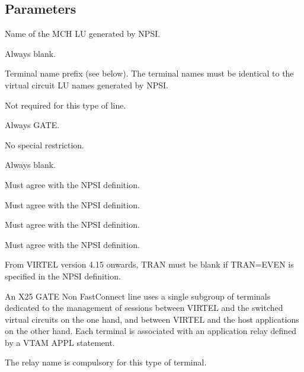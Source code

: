 \documentclass[letterpaper,10pt,english]{sphinxmanual}
\begin{document}
\ignorespaces 

\subsection{Parameters}
\label{\detokenize{connectivity_guide:index-62}}\label{\detokenize{connectivity_guide:id28}}\begin{description}
\sphinxAtStartPar
Name of the MCH LU generated by NPSI.

\sphinxAtStartPar
Always blank.

\sphinxAtStartPar
Terminal name prefix (see below). The terminal names must be
identical to the virtual circuit LU names generated by NPSI.

\sphinxAtStartPar
Not required for this type of line.

\sphinxAtStartPar
Always GATE.

\sphinxAtStartPar
No special restriction.

\sphinxAtStartPar
Always blank.

\sphinxAtStartPar
Must agree with the NPSI definition.

\sphinxAtStartPar
Must agree with the NPSI definition.

\sphinxAtStartPar
Must agree with the NPSI definition.

\sphinxAtStartPar
Must agree with the NPSI definition.

\end{description}

\sphinxAtStartPar
From VIRTEL version 4.15 onwards, TRAN must be blank if TRAN=EVEN is specified in the NPSI definition.

\sphinxAtStartPar
An X25 GATE Non Fast\sphinxhyphen{}Connect line uses a single sub\sphinxhyphen{}group of terminals dedicated to the management of sessions between VIRTEL and the switched virtual circuits on the one hand, and between VIRTEL and the host applications on the other hand. Each terminal is associated with an application relay defined by a VTAM APPL statement.

\sphinxAtStartPar
The relay name is compulsory for this type of terminal.
\end{document}

